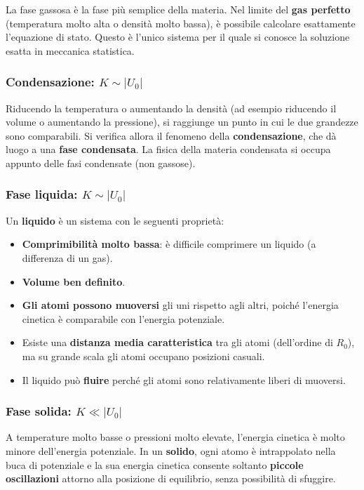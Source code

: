 La fase gassosa è la fase più semplice della materia. Nel limite del \textbf{gas perfetto} (temperatura molto alta o densità molto bassa), è possibile calcolare esattamente l'equazione di stato. Questo è l'unico sistema per il quale si conosce la soluzione esatta in meccanica statistica.

\subsubsection{Condensazione: $K \sim |U_0|$}

Riducendo la temperatura o aumentando la densità (ad esempio riducendo il volume o aumentando la pressione), si raggiunge un punto in cui le due grandezze sono comparabili. Si verifica allora il fenomeno della \textbf{condensazione}, che dà luogo a una \textbf{fase condensata}. La fisica della materia condensata si occupa appunto delle fasi condensate (non gassose).

\subsubsection{Fase liquida: $K \sim |U_0|$}

Un \textbf{liquido} è un sistema con le seguenti proprietà:
\begin{itemize}
    \item \textbf{Comprimibilità molto bassa}: è difficile comprimere un liquido (a differenza di un gas).
    \item \textbf{Volume ben definito}.
    \item \textbf{Gli atomi possono muoversi} gli uni rispetto agli altri, poiché l'energia cinetica è comparabile con l'energia potenziale.
    \item Esiste una \textbf{distanza media caratteristica} tra gli atomi (dell'ordine di $R_0$), ma su grande scala gli atomi occupano posizioni casuali.
    \item Il liquido può \textbf{fluire} perché gli atomi sono relativamente liberi di muoversi.
\end{itemize}

\subsubsection{Fase solida: $K \ll |U_0|$}

A temperature molto basse o pressioni molto elevate, l'energia cinetica è molto minore dell'energia potenziale. In un \textbf{solido}, ogni atomo è intrappolato nella buca di potenziale e la sua energia cinetica consente soltanto \textbf{piccole oscillazioni} attorno alla posizione di equilibrio, senza possibilità di sfuggire.

